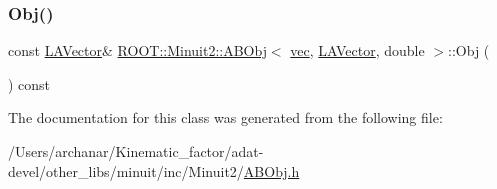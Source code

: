 \subsubsection{\texorpdfstring{Obj()}{Obj()}\hspace{0.1cm}{\footnotesize\ttfamily [3/3]}}
{\footnotesize\ttfamily const \mbox{\hyperlink{classROOT_1_1Minuit2_1_1LAVector}{L\+A\+Vector}}\& \mbox{\hyperlink{classROOT_1_1Minuit2_1_1ABObj}{R\+O\+O\+T\+::\+Minuit2\+::\+A\+B\+Obj}}$<$ \mbox{\hyperlink{classROOT_1_1Minuit2_1_1vec}{vec}}, \mbox{\hyperlink{classROOT_1_1Minuit2_1_1LAVector}{L\+A\+Vector}}, double $>$\+::Obj (\begin{DoxyParamCaption}{ }\end{DoxyParamCaption}) const\hspace{0.3cm}{\ttfamily [inline]}}



The documentation for this class was generated from the following file\+:\begin{DoxyCompactItemize}
\item 
/\+Users/archanar/\+Kinematic\+\_\+factor/adat-\/devel/other\+\_\+libs/minuit/inc/\+Minuit2/\mbox{\hyperlink{adat-devel_2other__libs_2minuit_2inc_2Minuit2_2ABObj_8h}{A\+B\+Obj.\+h}}\end{DoxyCompactItemize}

